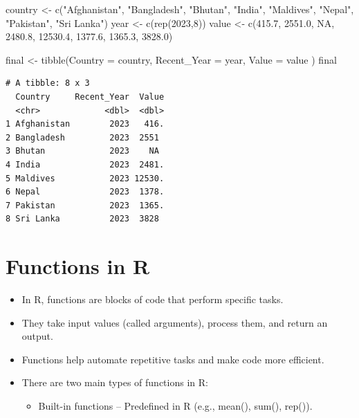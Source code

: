 \documentclass[
  letterpaper,
  DIV=11,
  numbers=noendperiod]{scrreprt}
\newenvironment{Shaded}{\begin{snugshade}}{\end{snugshade}}
\newcommand{\AttributeTok}[1]{\textcolor[rgb]{0.40,0.45,0.13}{#1}}
\newcommand{\ConstantTok}[1]{\textcolor[rgb]{0.56,0.35,0.01}{#1}}
\newcommand{\DecValTok}[1]{\textcolor[rgb]{0.68,0.00,0.00}{#1}}
\newcommand{\FloatTok}[1]{\textcolor[rgb]{0.68,0.00,0.00}{#1}}
\newcommand{\FunctionTok}[1]{\textcolor[rgb]{0.28,0.35,0.67}{#1}}
\newcommand{\NormalTok}[1]{\textcolor[rgb]{0.00,0.23,0.31}{#1}}
\newcommand{\OtherTok}[1]{\textcolor[rgb]{0.00,0.23,0.31}{#1}}
\newcommand{\StringTok}[1]{\textcolor[rgb]{0.13,0.47,0.30}{#1}}
\providecommand{\tightlist}{%
  \setlength{\itemsep}{0pt}\setlength{\parskip}{0pt}}\usepackage{longtable,booktabs,array}
\begin{document}
\begin{Shaded}
\begin{Highlighting}[]
\NormalTok{country }\OtherTok{\textless{}{-}} \FunctionTok{c}\NormalTok{(}\StringTok{"Afghanistan"}\NormalTok{, }\StringTok{"Bangladesh"}\NormalTok{, }\StringTok{"Bhutan"}\NormalTok{, }\StringTok{"India"}\NormalTok{, }\StringTok{"Maldives"}\NormalTok{,}
             \StringTok{"Nepal"}\NormalTok{, }\StringTok{"Pakistan"}\NormalTok{, }\StringTok{"Sri Lanka"}\NormalTok{)}
\NormalTok{year }\OtherTok{\textless{}{-}} \FunctionTok{c}\NormalTok{(}\FunctionTok{rep}\NormalTok{(}\DecValTok{2023}\NormalTok{,}\DecValTok{8}\NormalTok{))}
\NormalTok{value }\OtherTok{\textless{}{-}} \FunctionTok{c}\NormalTok{(}\FloatTok{415.7}\NormalTok{, }\FloatTok{2551.0}\NormalTok{, }\ConstantTok{NA}\NormalTok{, }\FloatTok{2480.8}\NormalTok{, }\FloatTok{12530.4}\NormalTok{, }\FloatTok{1377.6}\NormalTok{, }\FloatTok{1365.3}\NormalTok{, }\FloatTok{3828.0}\NormalTok{)}

\NormalTok{final }\OtherTok{\textless{}{-}} \FunctionTok{tibble}\NormalTok{(}\AttributeTok{Country =}\NormalTok{ country, }\AttributeTok{Recent\_Year =}\NormalTok{ year, }\AttributeTok{Value =}\NormalTok{ value )}
\NormalTok{final}
\end{Highlighting}
\end{Shaded}

\begin{verbatim}
# A tibble: 8 x 3
  Country     Recent_Year  Value
  <chr>             <dbl>  <dbl>
1 Afghanistan        2023   416.
2 Bangladesh         2023  2551 
3 Bhutan             2023    NA 
4 India              2023  2481.
5 Maldives           2023 12530.
6 Nepal              2023  1378.
7 Pakistan           2023  1365.
8 Sri Lanka          2023  3828 
\end{verbatim}

\section{Functions in R}\label{functions-in-r}

\begin{itemize}
\item
  In R, functions are blocks of code that perform specific tasks.
\item
  They take input values (called arguments), process them, and return an
  output.
\item
  Functions help automate repetitive tasks and make code more efficient.
\item
  There are two main types of functions in R:

  \begin{itemize}
  \tightlist
  \item
    Built-in functions -- Predefined in R (e.g., mean(), sum(), rep()).
  \end{itemize}
\end{itemize}
\end{document}
